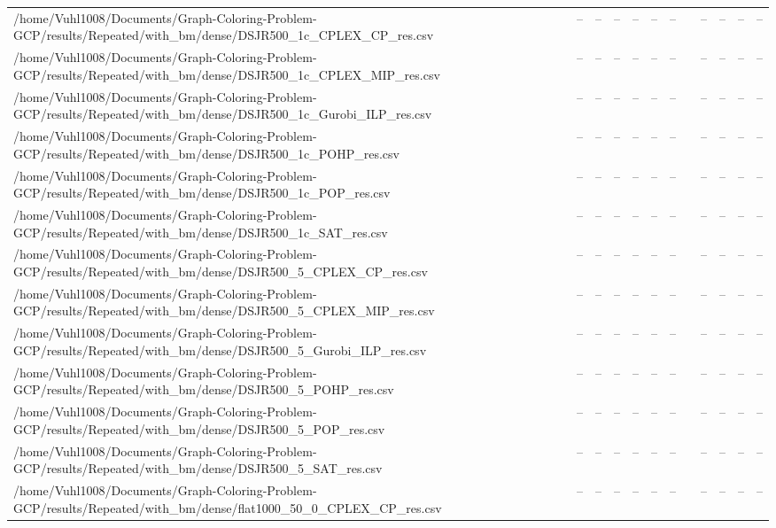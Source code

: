 \begin{table}[htbp]
\begin{tabular}{llllllllllll}
/home/Vuhl1008/Documents/Graph-Coloring-Problem-GCP/results/Repeated/with\_bm/dense/DSJR500\_1c\_CPLEX\_CP\_res.csv & -- & -- & -- & -- & -- & -- & {} & -- & -- & -- & -- \\
/home/Vuhl1008/Documents/Graph-Coloring-Problem-GCP/results/Repeated/with\_bm/dense/DSJR500\_1c\_CPLEX\_MIP\_res.csv & -- & -- & -- & -- & -- & -- & {} & -- & -- & -- & -- \\
/home/Vuhl1008/Documents/Graph-Coloring-Problem-GCP/results/Repeated/with\_bm/dense/DSJR500\_1c\_Gurobi\_ILP\_res.csv & -- & -- & -- & -- & -- & -- & {} & -- & -- & -- & -- \\
/home/Vuhl1008/Documents/Graph-Coloring-Problem-GCP/results/Repeated/with\_bm/dense/DSJR500\_1c\_POHP\_res.csv & -- & -- & -- & -- & -- & -- & {} & -- & -- & -- & -- \\
/home/Vuhl1008/Documents/Graph-Coloring-Problem-GCP/results/Repeated/with\_bm/dense/DSJR500\_1c\_POP\_res.csv & -- & -- & -- & -- & -- & -- & {} & -- & -- & -- & -- \\
/home/Vuhl1008/Documents/Graph-Coloring-Problem-GCP/results/Repeated/with\_bm/dense/DSJR500\_1c\_SAT\_res.csv & -- & -- & -- & -- & -- & -- & {} & -- & -- & -- & -- \\
/home/Vuhl1008/Documents/Graph-Coloring-Problem-GCP/results/Repeated/with\_bm/dense/DSJR500\_5\_CPLEX\_CP\_res.csv & -- & -- & -- & -- & -- & -- & {} & -- & -- & -- & -- \\
/home/Vuhl1008/Documents/Graph-Coloring-Problem-GCP/results/Repeated/with\_bm/dense/DSJR500\_5\_CPLEX\_MIP\_res.csv & -- & -- & -- & -- & -- & -- & {} & -- & -- & -- & -- \\
/home/Vuhl1008/Documents/Graph-Coloring-Problem-GCP/results/Repeated/with\_bm/dense/DSJR500\_5\_Gurobi\_ILP\_res.csv & -- & -- & -- & -- & -- & -- & {} & -- & -- & -- & -- \\
/home/Vuhl1008/Documents/Graph-Coloring-Problem-GCP/results/Repeated/with\_bm/dense/DSJR500\_5\_POHP\_res.csv & -- & -- & -- & -- & -- & -- & {} & -- & -- & -- & -- \\
/home/Vuhl1008/Documents/Graph-Coloring-Problem-GCP/results/Repeated/with\_bm/dense/DSJR500\_5\_POP\_res.csv & -- & -- & -- & -- & -- & -- & {} & -- & -- & -- & -- \\
/home/Vuhl1008/Documents/Graph-Coloring-Problem-GCP/results/Repeated/with\_bm/dense/DSJR500\_5\_SAT\_res.csv & -- & -- & -- & -- & -- & -- & {} & -- & -- & -- & -- \\
/home/Vuhl1008/Documents/Graph-Coloring-Problem-GCP/results/Repeated/with\_bm/dense/flat1000\_50\_0\_CPLEX\_CP\_res.csv & -- & -- & -- & -- & -- & -- & {} & -- & -- & -- & -- \\

\end{tabular}
\end{table}
